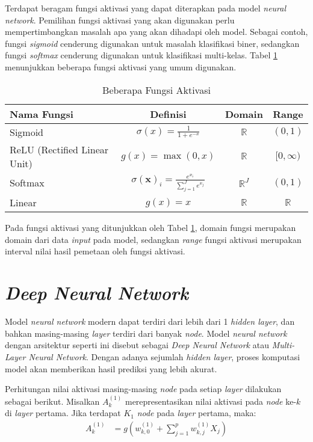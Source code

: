 \documentclass[a4paper,12pt]{report}
\begin{document}
Terdapat beragam fungsi aktivasi yang dapat diterapkan pada model \textit{neural network}. Pemilihan fungsi aktivasi yang akan digunakan perlu mempertimbangkan masalah apa yang akan dihadapi oleh model. Sebagai contoh, fungsi \textit{sigmoid} cenderung digunakan untuk masalah klasifikasi biner, sedangkan fungsi \textit{softmax} cenderung digunakan untuk klasifikasi multi-kelas. Tabel \ref{tabelfungsi} menunjukkan beberapa fungsi aktivasi yang umum digunakan.
\begin{longtable}{|l|c|c|c|}
	\caption{Beberapa Fungsi Aktivasi} \label{tabelfungsi}\\
	\hline
	\textbf{Nama Fungsi} & \textbf{Definisi} & \textbf{Domain} & \textbf{Range} \\ \hline
	Sigmoid & $\sigma(x) = \frac{1}{1 + e^{-x}}$ & $\mathbb{R}$ & $(0, 1)$ \\
	\hline
	
	ReLU (Rectified Linear Unit) & $g(x) = \max(0, x)$ & $\mathbb{R}$ & $[0, \infty)$ \\
	\hline
	
	Softmax & $\sigma(\mathbf{x})_i = \frac{e^{x_i}}{\sum_{j=1}^{J} e^{x_j}}$ & $\mathbb{R}^J$ & $(0, 1)$ \\
	\hline
	
	Linear & $g(x) = x$ & $\mathbb{R}$ & $\mathbb{R}$ \\
	\hline
\end{longtable}
Pada fungsi aktivasi yang ditunjukkan oleh Tabel \ref{tabelfungsi}, domain fungsi merupakan domain dari data \textit{input} pada model, sedangkan \textit{range} fungsi aktivasi merupakan interval nilai hasil pemetaan oleh fungsi aktivasi.

\section{\textit{Deep Neural Network}}

Model \textit{neural network} modern dapat terdiri dari lebih dari 1 \textit{hidden layer}, dan bahkan masing-masing \textit{layer} terdiri dari banyak \textit{node}. Model \textit{neural network} dengan arsitektur seperti ini disebut sebagai \textit{Deep Neural Network} atau \textit{Multi-Layer Neural Network}. Dengan adanya sejumlah \textit{hidden layer}, proses komputasi model akan memberikan hasil prediksi yang lebih akurat\cite{sohilIntroductionStatisticalLearning2022}. 

Perhitungan nilai aktivasi masing-masing \textit{node} pada setiap \textit{layer} dilakukan sebagai berikut. Misalkan $A_k^{(1)}$ merepresentasikan nilai aktivasi pada \textit{node} ke-$k$ di \textit{layer} pertama. Jika terdapat $K_1$ \textit{node} pada \textit{layer} pertama, maka:
\begin{equation}
	\begin{split}
		A_k^{(1)} &= g\left(w_{k,0}^{(1)} + \sum\limits_{j=1}^{p}w_{k,j}^{(1)}X_{j}\right)
	\end{split}
	\label{multilayerA1}
\end{equation}
\end{document}
